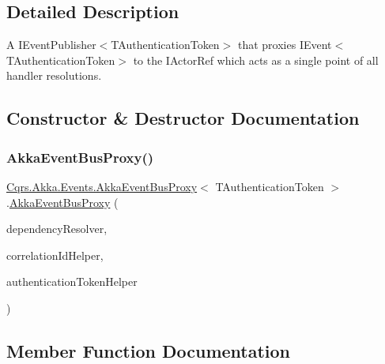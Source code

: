 \subsection{Detailed Description}
A I\+Event\+Publisher$<$\+T\+Authentication\+Token$>$ that proxies I\+Event$<$\+T\+Authentication\+Token$>$ to the I\+Actor\+Ref which acts as a single point of all handler resolutions. 



\subsection{Constructor \& Destructor Documentation}
\mbox{\label{classCqrs_1_1Akka_1_1Events_1_1AkkaEventBusProxy_a2f886b4e9e64188fe69478c39c96f2b5}} 
\subsubsection{\texorpdfstring{Akka\+Event\+Bus\+Proxy()}{AkkaEventBusProxy()}}
{\footnotesize\ttfamily \hyperlink{classCqrs_1_1Akka_1_1Events_1_1AkkaEventBusProxy}{Cqrs.\+Akka.\+Events.\+Akka\+Event\+Bus\+Proxy}$<$ T\+Authentication\+Token $>$.\hyperlink{classCqrs_1_1Akka_1_1Events_1_1AkkaEventBusProxy}{Akka\+Event\+Bus\+Proxy} (\begin{DoxyParamCaption}\item[{\hyperlink{interfaceCqrs_1_1Configuration_1_1IDependencyResolver}{I\+Dependency\+Resolver}}]{dependency\+Resolver,  }\item[{I\+Correlation\+Id\+Helper}]{correlation\+Id\+Helper,  }\item[{\hyperlink{interfaceCqrs_1_1Authentication_1_1IAuthenticationTokenHelper}{I\+Authentication\+Token\+Helper}$<$ T\+Authentication\+Token $>$}]{authentication\+Token\+Helper }\end{DoxyParamCaption})}



\subsection{Member Function Documentation}
\mbox{\label{classCqrs_1_1Akka_1_1Events_1_1AkkaEventBusProxy_a656daead2fe6f30487855dbaea5a3c83}} 
